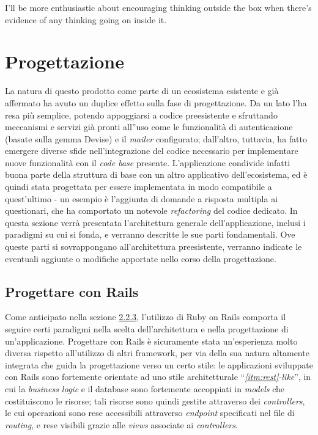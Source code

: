 

\begin{savequote}[75mm]
        I'll be more enthusiastic about encouraging thinking outside the box when there's evidence of any thinking going on inside it.
\end{savequote}

\chapter{Progettazione}
\label{chap4}
La natura di questo prodotto come parte di un ecosistema esistente e già affermato ha avuto un duplice effetto sulla fase di progettazione. Da un lato l'ha resa più semplice, potendo appoggiarsi a codice preesistente e sfruttando meccanismi e servizi già pronti all''uso come le funzionalità di autenticazione (basate sulla gemma Devise) e il \textit{mailer} configurato; dall'altro, tuttavia, ha fatto emergere diverse sfide nell'integrazione del codice necessario per implementare nuove funzionalità con il \textit{code base} presente. L'applicazione condivide infatti buona parte della struttura di base con un altro applicativo dell'ecosistema, ed è quindi stata progettata per essere implementata in modo compatibile a quest'ultimo - un esempio è l'aggiunta di domande a risposta multipla ai questionari, che ha comportato un notevole \textit{refactoring} del codice dedicato.
In questa sezione verrà presentata l'architettura generale dell'applicazione, inclusi i paradigmi su cui si fonda, e verranno descritte le sue parti fondamentali. Ove queste parti si sovrappongano all'architettura preesistente, verranno indicate le eventuali aggiunte o modifiche apportate nello corso della progettazione.

\section{Progettare con Rails}
Come anticipato nella sezione \hyperref[sec:2.2.3]{2.2.3}, l'utilizzo di Ruby on Rails comporta il seguire certi paradigmi nella scelta dell'architettura e nella progettazione di un'applicazione. Progettare con Rails è sicuramente stata un'esperienza molto diversa rispetto all'utilizzo di altri framework, per via della sua natura altamente integrata che guida la progettazione verso un certo stile: le applicazioni sviluppate con Rails sono fortemente orientate ad uno stile architetturale ``\textit{\ref{itm:rest}-like}'', in cui la \textit{business logic} e il database sono fortemente accoppiati in \textit{models} che costituiscono le risorse; tali risorse sono quindi gestite attraverso dei \textit{controllers}, le cui operazioni sono rese accessibili attraverso \textit{endpoint} specificati nel file di \textit{routing}, e rese visibili grazie alle \textit{views} associate ai \textit{controllers}.

